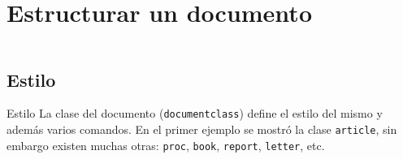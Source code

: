 \section{Estructurar un documento}

\begin{frame}
    \begin{columns}[t]
        \begin{column}{.5\textwidth}
          \tableofcontents[sections={1-2},currentsection]
        \end{column}
        \begin{column}{.5\textwidth}
          \tableofcontents[sections={3-4},currentsection]
        \end{column}
    \end{columns}
\end{frame}

\subsection{Estilo}
\begin{frame}[fragile]{Estilo}
La clase del documento (\texttt{documentclass}) define el estilo del
mismo y además varios comandos. En el primer ejemplo se mostró la clase
\texttt{article}, sin embargo existen muchas otras: \texttt{proc},
\texttt{book}, \texttt{report}, \texttt{letter}, etc.
\end{frame}

